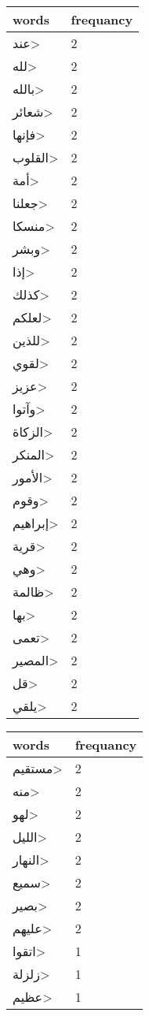 \documentclass{article}
\begin{document}
\begin{multicols}{3}
\begin{center}
\begin{tabular}{ P{2cm}  P{1cm}}
\textbf{words}    & \textbf{frequancy}  \\
\hline
\<عند> & 2 \\ 
\<لله> & 2 \\ 
\<بالله> & 2 \\ 
\<شعائر> & 2 \\ 
\<فإنها> & 2 \\ 
\<القلوب> & 2 \\ 
\<أمة> & 2 \\ 
\<جعلنا> & 2 \\ 
\<منسكا> & 2 \\ 
\<وبشر> & 2 \\ 
\<إذا> & 2 \\ 
\<كذلك> & 2 \\ 
\<لعلكم> & 2 \\ 
\<للذين> & 2 \\ 
\<لقوي> & 2 \\ 
\<عزيز> & 2 \\ 
\<وآتوا> & 2 \\ 
\<الزكاة> & 2 \\ 
\<المنكر> & 2 \\ 
\<الأمور> & 2 \\ 
\<وقوم> & 2 \\ 
\<إبراهيم> & 2 \\ 
\<قرية> & 2 \\ 
\<وهي> & 2 \\ 
\<ظالمة> & 2 \\ 
\<بها> & 2 \\ 
\<تعمى> & 2 \\ 
\<المصير> & 2 \\ 
\<قل> & 2 \\ 
\<يلقي> & 2 \\ 
\end{tabular} 
\begin{tabular}{ P{2cm}  P{1cm}} 
\textbf{words}    & \textbf{frequancy}  \\
\hline
\<مستقيم> & 2 \\ 
\<منه> & 2 \\ 
\<لهو> & 2 \\ 
\<الليل> & 2 \\ 
\<النهار> & 2 \\ 
\<سميع> & 2 \\ 
\<بصير> & 2 \\ 
\<عليهم> & 2 \\ 
\<اتقوا> & 1 \\ 
\<زلزلة> & 1 \\ 
\<عظيم> & 1 \\ 

\end{tabular}
\end{center}
\end{multicols}
\end{document}
